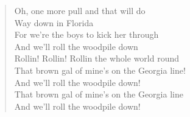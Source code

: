 \documentclass[11pt]{article}
\begin{document}
\begin{verse}
\vspace*{1em}
Oh, one more pull and that will do\\
Way down in Florida\\
For we're the boys to kick her through\\
And we'll roll the woodpile down\\
\vspace*{1em}
Rollin! Rollin! Rollin the whole world round\\
That brown gal of mine's on the Georgia line!\\
And we'll roll the woodpile down!\\
That brown gal of mine's on the Georgia line\\
And we'll roll the woodpile down!\\
\end{verse}
\clearpage
\end{document}
